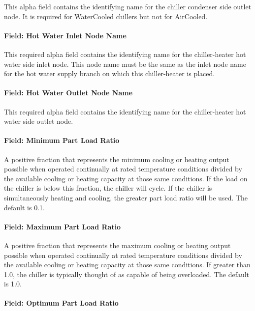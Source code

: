 This alpha field contains the identifying name for the chiller condenser side outlet node. It is required for WaterCooled chillers but not for AirCooled.

\paragraph{Field: Hot Water Inlet Node Name}\label{field-hot-water-inlet-node-name-1}

This required alpha field contains the identifying name for the chiller-heater hot water side inlet node. This node name must be the same as the inlet node name for the hot water supply branch on which this chiller-heater is placed.

\paragraph{Field: Hot Water Outlet Node Name}\label{field-hot-water-outlet-node-name-1}

This required alpha field contains the identifying name for the chiller-heater hot water side outlet node.

\paragraph{Field: Minimum Part Load Ratio}\label{field-minimum-part-load-ratio-8}

A positive fraction that represents the minimum cooling or heating output possible when operated continually at rated temperature conditions divided by the available cooling or heating capacity at those same conditions. If the load on the chiller is below this fraction, the chiller will cycle. If the chiller is simultaneously heating and cooling, the greater part load ratio will be used. The default is 0.1.

\paragraph{Field: Maximum Part Load Ratio}\label{field-maximum-part-load-ratio-8}

A positive fraction that represents the maximum cooling or heating output possible when operated continually at rated temperature conditions divided by the available cooling or heating capacity at those same conditions. If greater than 1.0, the chiller is typically thought of as capable of being overloaded. The default is 1.0.

\paragraph{Field: Optimum Part Load Ratio}\label{field-optimum-part-load-ratio-8}

